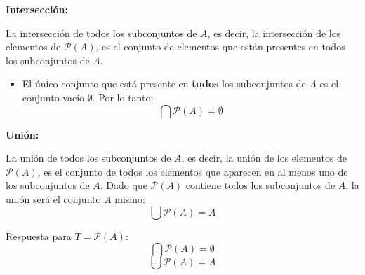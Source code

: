 \begin{solution}
\begin{itemize}
        \textbf{Intersección:}
        
        La intersección de todos los subconjuntos de \( A \), es decir, la intersección de los elementos de \( \mathscr{P}(A) \), es el conjunto de elementos que están presentes en todos los subconjuntos de \( A \).
        
        \begin{itemize}
            \item El único conjunto que está presente en \textbf{todos} los subconjuntos de \( A \) es el conjunto vacío \( \emptyset \). Por lo tanto:
          \[
          \bigcap \mathscr{P}(A) = \emptyset
          \]
        \end{itemize}
        
        \textbf{Unión:}
        
        La unión de todos los subconjuntos de \( A \), es decir, la unión de los elementos de \( \mathscr{P}(A) \), es el conjunto de todos los elementos que aparecen en al menos uno de los subconjuntos de \( A \). Dado que \( \mathscr{P}(A) \) contiene todos los subconjuntos de \( A \), la unión será el conjunto \( A \) mismo:
        \[
        \bigcup \mathscr{P}(A) = A
        \]
        
        Respuesta para \( T = \mathscr{P}(A) \):
        \[
        \bigcap \mathscr{P}(A) = \emptyset
        \]
        \[
        \bigcup \mathscr{P}(A) = A
        \]
    \end{itemize}
\end{solution}